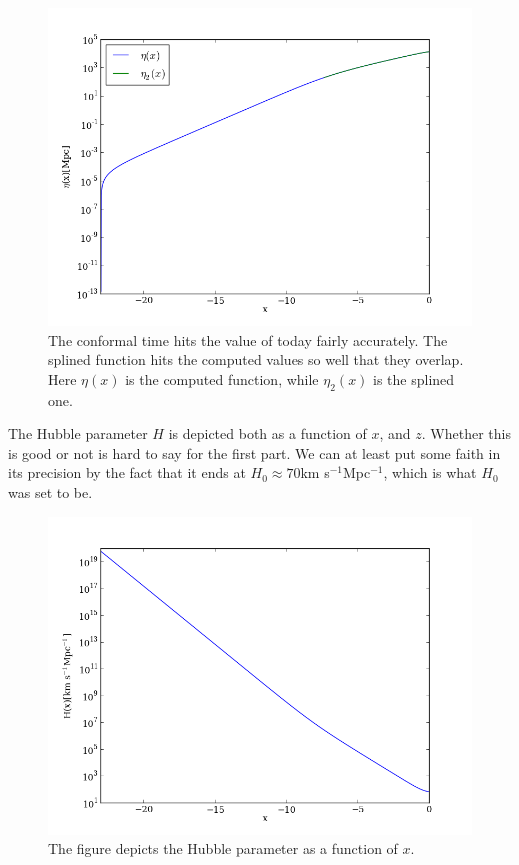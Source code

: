 \documentclass{aa}   %
\begin{document}
  \begin{figure}[ht]
  \includegraphics[width=.49\textwidth]{figure_1.png}
  \caption{The conformal time hits the value of today fairly accurately. The splined function hits the computed values so well that they overlap. Here $\eta(x)$ is the computed function, while $\eta_2(x)$ is the splined one.}
 \label{figure1}
 \end{figure}
 
 The Hubble parameter $H$ is depicted both as a function of $x$, and $z$. Whether this is good or not is hard to say for the first part. We can at least put some faith in its precision by the fact that it ends at $H_0 \approx 70$km s$^{-1}$Mpc$^{-1}$, which is what $H_0$ was set to be. 
 
  \begin{figure}[ht]
  \includegraphics[width=.49\textwidth]{figure_2.png}
  \caption{The figure depicts the Hubble parameter as a function of $x$.}
 \label{figure2}
 \end{figure}
 
\end{document}
